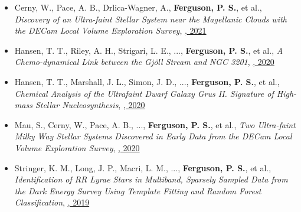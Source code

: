 \begin{itemize}[itemsep=1pt]
    \item {Cerny}, W., {Pace}, A. B., {Drlica-Wagner}, A., \textbf{Ferguson, P. S.}, et al., \textit{{Discovery of an Ultra-faint Stellar System near the Magellanic Clouds with the DECam Local Volume Exploration Survey}}, \href{https://ui.adsabs.harvard.edu/abs/2021ApJ...910...18C}{\textbf{\apj}, 2021}
    \item {Hansen}, T. T., {Riley}, A. H., {Strigari}, L. E., ..., \textbf{Ferguson, P. S.}, et al., \textit{{A Chemo-dynamical Link between the Gj{\"o}ll Stream and NGC 3201}}, \href{https://ui.adsabs.harvard.edu/abs/2020ApJ...901...23H}{\textbf{\apj}, 2020}
    \item {Hansen}, T. T., {Marshall}, J. L., {Simon}, J. D., ..., \textbf{Ferguson, P. S.}, et al., \textit{{Chemical Analysis of the Ultrafaint Dwarf Galaxy Grus II. Signature of High-mass Stellar Nucleosynthesis}}, \href{https://ui.adsabs.harvard.edu/abs/2020ApJ...897..183H}{\textbf{\apj}, 2020}
    \item {Mau}, S., {Cerny}, W., {Pace}, A. B., ..., \textbf{Ferguson, P. S.}, et al., \textit{{Two Ultra-faint Milky Way Stellar Systems Discovered in Early Data from the DECam Local Volume Exploration Survey}}, \href{https://ui.adsabs.harvard.edu/abs/2020ApJ...890..136M}{\textbf{\apj}, 2020}
    \item {Stringer}, K. M., {Long}, J. P., {Macri}, L. M., ..., \textbf{Ferguson, P. S.}, et al., \textit{{Identification of RR Lyrae Stars in Multiband, Sparsely Sampled Data from the Dark Energy Survey Using Template Fitting and Random Forest Classification}}, \href{https://ui.adsabs.harvard.edu/abs/2019AJ....158...16S}{\textbf{\aj}, 2019}
\end{itemize}
